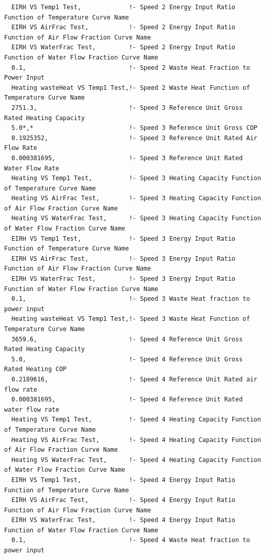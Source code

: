 \begin{lstlisting}
  EIRH VS Temp1 Test,             !- Speed 2 Energy Input Ratio Function of Temperature Curve Name
  EIRH VS AirFrac Test,           !- Speed 2 Energy Input Ratio Function of Air Flow Fraction Curve Name
  EIRH VS WaterFrac Test,         !- Speed 2 Energy Input Ratio Function of Water Flow Fraction Curve Name
  0.1,                            !- Speed 2 Waste Heat Fraction to Power Input
  Heating wasteHeat VS Temp1 Test,!- Speed 2 Waste Heat Function of Temperature Curve Name
  2751.3,                         !- Speed 3 Reference Unit Gross Rated Heating Capacity
  5.0*,*                          !- Speed 3 Reference Unit Gross COP
  0.1925352,                      !- Speed 3 Reference Unit Rated Air Flow Rate
  0.000381695,                    !- Speed 3 Reference Unit Rated Water Flow Rate
  Heating VS Temp1 Test,          !- Speed 3 Heating Capacity Function of Temperature Curve Name
  Heating VS AirFrac Test,        !- Speed 3 Heating Capacity Function of Air Flow Fraction Curve Name
  Heating VS WaterFrac Test,      !- Speed 3 Heating Capacity Function of Water Flow Fraction Curve Name
  EIRH VS Temp1 Test,             !- Speed 3 Energy Input Ratio Function of Temperature Curve Name
  EIRH VS AirFrac Test,           !- Speed 3 Energy Input Ratio Function of Air Flow Fraction Curve Name
  EIRH VS WaterFrac Test,         !- Speed 3 Energy Input Ratio Function of Water Flow Fraction Curve Name
  0.1,                            !- Speed 3 Waste Heat fraction to power input
  Heating wasteHeat VS Temp1 Test,!- Speed 3 Waste Heat Function of Temperature Curve Name
  3659.6,                         !- Speed 4 Reference Unit Gross Rated Heating Capacity
  5.0,                            !- Speed 4 Reference Unit Gross Rated Heating COP
  0.2189616,                      !- Speed 4 Reference Unit Rated air flow rate
  0.000381695,                    !- Speed 4 Reference Unit Rated water flow rate
  Heating VS Temp1 Test,          !- Speed 4 Heating Capacity Function of Temperature Curve Name
  Heating VS AirFrac Test,        !- Speed 4 Heating Capacity Function of Air Flow Fraction Curve Name
  Heating VS WaterFrac Test,      !- Speed 4 Heating Capacity Function of Water Flow Fraction Curve Name
  EIRH VS Temp1 Test,             !- Speed 4 Energy Input Ratio Function of Temperature Curve Name
  EIRH VS AirFrac Test,           !- Speed 4 Energy Input Ratio Function of Air Flow Fraction Curve Name
  EIRH VS WaterFrac Test,         !- Speed 4 Energy Input Ratio Function of Water Flow Fraction Curve Name
  0.1,                            !- Speed 4 Waste Heat fraction to power input

\end{lstlisting}

